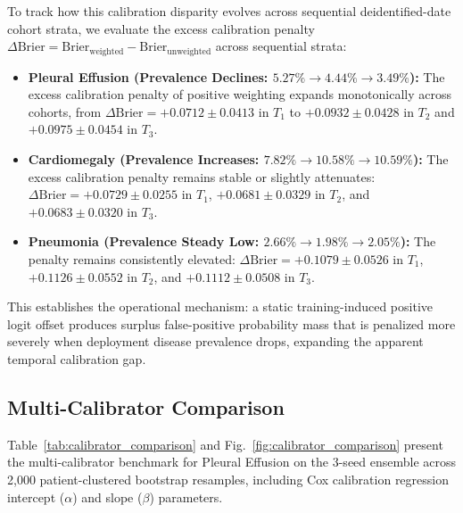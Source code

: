 \documentclass[preprint,12pt]{elsarticle}
\begin{document}
To track how this calibration disparity evolves across sequential deidentified-date cohort strata, we evaluate the excess calibration penalty $\Delta\text{Brier} = \text{Brier}_{\text{weighted}} - \text{Brier}_{\text{unweighted}}$ across sequential strata:
\begin{itemize}
    \item \textbf{Pleural Effusion (Prevalence Declines: $5.27\% \to 4.44\% \to 3.49\%$):} The excess calibration penalty of positive weighting expands monotonically across cohorts, from $\Delta\text{Brier} = +0.0712 \pm 0.0413$ in $T_1$ to $+0.0932 \pm 0.0428$ in $T_2$ and $+0.0975 \pm 0.0454$ in $T_3$.
    \item \textbf{Cardiomegaly (Prevalence Increases: $7.82\% \to 10.58\% \to 10.59\%$):} The excess calibration penalty remains stable or slightly attenuates: $\Delta\text{Brier} = +0.0729 \pm 0.0255$ in $T_1$, $+0.0681 \pm 0.0329$ in $T_2$, and $+0.0683 \pm 0.0320$ in $T_3$.
    \item \textbf{Pneumonia (Prevalence Steady Low: $2.66\% \to 1.98\% \to 2.05\%$):} The penalty remains consistently elevated: $\Delta\text{Brier} = +0.1079 \pm 0.0526$ in $T_1$, $+0.1126 \pm 0.0552$ in $T_2$, and $+0.1112 \pm 0.0508$ in $T_3$.
\end{itemize}
This establishes the operational mechanism: a static training-induced positive logit offset produces surplus false-positive probability mass that is penalized more severely when deployment disease prevalence drops, expanding the apparent temporal calibration gap.

\begin{table}[!t]
\caption{Experimental Matrix Evaluation: Primary Longitudinal Performance across Architectures, Loss Objectives, and Thoracic Pathologies (Strata $T_1 \to T_3$). Values represent mean $\pm$ standard deviation across three independently trained random seeds ($S \in \{42, 123, 2026\}$). Complete 17-column trajectories across all intermediate deployment strata ($T_1, T_2, T_3$) and log-loss metrics are detailed in Supplementary Table~S3.}
\label{tab:factorial_matrix}
\centering
\small
\resizebox{\textwidth}{!}{%

}
\end{table}

\subsection{Multi-Calibrator Comparison}
Table~\ref{tab:calibrator_comparison} and Fig.~\ref{fig:calibrator_comparison} present the multi-calibrator benchmark for Pleural Effusion on the 3-seed ensemble across 2,000 patient-clustered bootstrap resamples, including Cox calibration regression intercept ($\alpha$) and slope ($\beta$) parameters.
\end{document}
